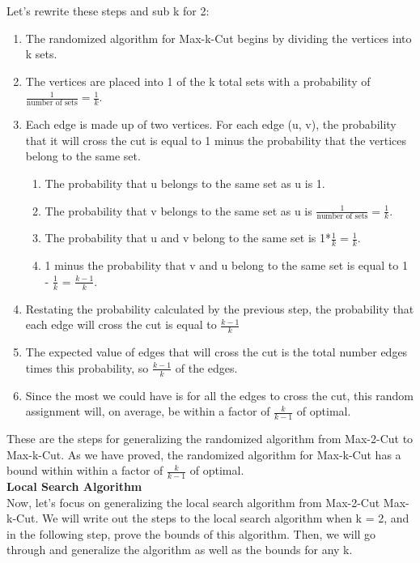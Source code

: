 \documentclass[11pt, solution, letterpaper]{format}
\begin{document}
Let's rewrite these steps and sub k for 2:
\begin{enumerate}
  \item The randomized algorithm for Max-k-Cut begins by dividing the vertices into k sets.
  \item The vertices are placed into 1 of the k total sets with a probability of $\frac{1}{\text{number of sets}}=\frac{1}{k}$. 
  \item  Each edge is made up of two vertices. For each edge (u, v), the probability that it will cross the cut is equal to 1 minus the probability that the vertices belong to the same set. 
  \begin{enumerate}
  \item The probability that u belongs to the same set as u is 1. 
  \item The probability that v belongs to the same set as u is $\frac{1}{\text{number of sets}} = \frac{1}{k}$.
  \item  The probability that u and v belong to the same set is 1*$\frac{1}{k} = \frac{1}{k}$.
  \item 1 minus the probability that v and u belong to the same set is equal to 1 - $\frac{1}{k}$ = $\frac{k - 1}{k}$. 
  \end{enumerate}
  \item Restating the probability calculated by the previous step, the probability that each edge will cross the cut is equal to $\frac{k - 1}{k}$
  \item The expected value of edges that will cross the cut is the total number edges times this probability, so  $\frac{k - 1}{k}$ of the edges.
  \item    Since the most we could have is for all the edges to cross the cut, this random assignment will, on average, be within a factor of $\frac{k}{k - 1}$ of optimal.
\end{enumerate}

These are the steps for generalizing the randomized algorithm from Max-2-Cut to Max-k-Cut. As we have proved, the randomized algorithm for Max-k-Cut has a bound within  within a factor of $\frac{k}{k - 1}$ of optimal.\\

\textbf{Local Search Algorithm} \\
Now, let's focus on generalizing the local search algorithm from Max-2-Cut Max-k-Cut. We will write out the steps to the local search algorithm when k = 2, and in the following step, prove the bounds of this algorithm. Then, we will go through and generalize the algorithm as well as the bounds for any k. \\
\end{document}
